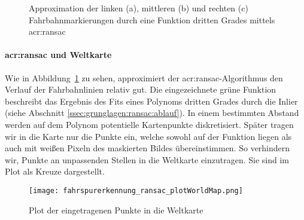 \begin{figure}[H]
  \centering
  \quad
  \quad
  \caption{Approximation der linken (a), mittleren (b) und rechten (c) Fahrbahnmarkierungen durch eine Funktion dritten Grades mittels \gls{acr:ransac}}
\label{fig:fahrspurerkennung_ransac_ransac}
\end{figure} 

\paragraph{\gls{acr:ransac} und Weltkarte} 
Wie in Abbildung~\ref{fig:fahrspurerkennung_ransac_ransac} zu sehen, approximiert der \gls{acr:ransac}-Algorithmus den Verlauf der Fahrbahnlinien relativ gut. Die eingezeichnete grüne Funktion beschreibt das Ergebnis des Fits eines Polynoms dritten Grades durch die Inlier (siehe Abschnitt \ref{ssec:grunglagen:ransac:ablauf}). In einem bestimmten Abstand werden auf dem Polynom potentielle Kartenpunkte diskretisiert. Später tragen wir in die Karte nur die Punkte ein, welche sowohl auf der Funktion liegen als auch mit weißen Pixeln des maskierten Bildes übereinstimmen. So verhindern wir, Punkte an unpassenden Stellen in die Weltkarte einzutragen. Sie sind im Plot als Kreuze dargestellt. 

\begin{figure}[H] %
  \centering
  \texttt{[image: fahrspurerkennung\_ransac\_plotWorldMap.png]}
  \caption{Plot der eingetragenen Punkte in die Weltkarte}
\label{fig:fahrspurerkennung_ransac_karte}
\end{figure} 

